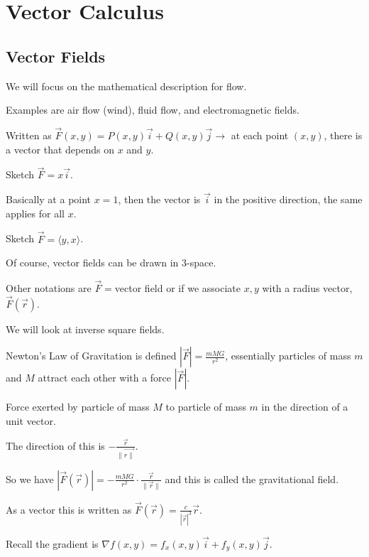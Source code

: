 \documentclass[../calc3.tex]{subfiles}
\begin{document}
\chapter{Vector Calculus}
\section{Vector Fields}
We will focus on the mathematical description for flow.

Examples are air flow (wind), fluid flow, and electromagnetic fields.

\begin{definition}
    Written as $\vec{F}(x,y)=P(x,y)\vec{i}+Q(x,y)\vec{j} \rightarrow$ at each point $(x,y)$, there is a vector that depends on $x$ and $y$.
\end{definition}

\begin{example}
    Sketch $\vec{F}=x\vec{i}$.

    Basically at a point $x=1$, then the vector is $\vec{i}$ in the positive direction, the same applies for all $x$.
\end{example}

\ex Sketch $\vec{F}=\langle y,x\rangle$.

Of course, vector fields can be drawn in $3$-space.

Other notations are $\vec{F} = $vector field or if we associate $x,y$ with a radius vector, $\vec{F}(\vec{r})$.

\begin{example}
    We will look at inverse square fields.

    Newton's Law of Gravitation is defined $\left|\vec{F}\right|=\frac{mMG}{r^2}$, essentially particles of mass $m$ and $M$ attract each other with a force $\left|\vec{F}\right|$.

    Force exerted by particle of mass $M$ to particle of mass $m$ in the direction of a unit vector.

    The direction of this is $-\frac{\vec{r}}{\| \vec{r\|}}$.

    So we have $\left|\vec{F}(\vec{r})\right|=-\frac{mMG}{r^2}\cdot \frac{\vec{r}}{\| \vec{r}\|}$ and this is called the gravitational field.

    As a vector this is written as $\vec{F}(\vec{r})=\frac{c}{|\vec{r}|^3}\vec{r}$.
\end{example}

Recall the gradient is $\nabla f(x,y)=f_x(x,y)\vec{i}+f_y(x,y)\vec{j}$.
\end{document}

